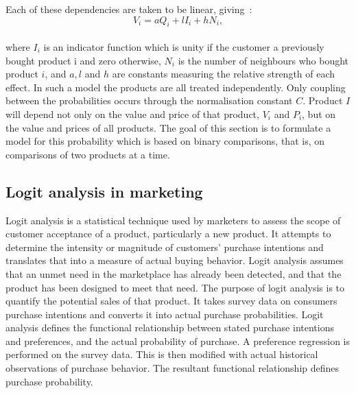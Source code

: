 Each of these dependencies are taken to be linear, giving~\cite{patel}:
\\
\begin{equation} \label{eq:9}
V_i = aQ_i + lI_i + hN_i,
\end{equation}
\\
where $I_i$ is an indicator function which is unity if the customer a previously bought product i and zero otherwise,
$N_i$ is the number of neighbours who bought product $i$, and $a, l$ and $h$ are constants measuring the relative strength
of each effect.
In such a model the products are all treated independently.
Only coupling between the probabilities occurs through the normalisation constant $C$.
Product $I$ will depend not only on the value and price of that product, $V_i$ and $P_i$, but on the value and prices of all products.
The goal of this section is to formulate a model for this probability which is based on binary comparisons, that is,
on comparisons of two products at a time.\\
\subsection{Logit analysis in marketing} \label{subsec:logit}
Logit analysis is a statistical technique used by marketers to assess the scope of customer acceptance of a product, particularly a new product.
It attempts to determine the intensity or magnitude of customers' purchase intentions and translates that into a measure of actual buying behavior.
Logit analysis assumes that an unmet need in the marketplace has already been detected, and that the product has been designed to meet that need.
The purpose of logit analysis is to quantify the potential sales of that product.
It takes survey data on consumers purchase intentions and converts it into actual purchase probabilities.
Logit analysis defines the functional relationship between stated purchase intentions and preferences, and the actual probability of purchase.
A preference regression is performed on the survey data.
This is then modified with actual historical observations of purchase behavior.
The resultant functional relationship defines purchase probability.

